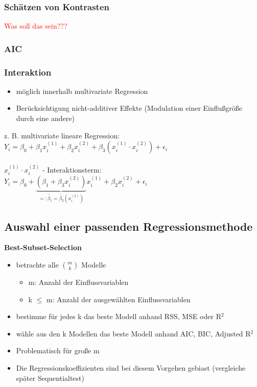 \subsubsection{Schätzen von Kontrasten}
\textcolor{red}{Was soll das sein???}
\subsubsection{AIC}

\subsubsection{Interaktion}
\begin{itemize}
	\item möglich innerhalb multivariate Regression
	\item Berücksichtigung nicht-additiver Effekte (Modulation einer Einflußgröße durch eine andere)
\end{itemize}

z. B. multivariate lineare Regression:\\
$Y_i=\beta_0 + \beta_1 x_i^{(1)} + \beta_2 x_i^{(2)} + \beta_3 (x_i^{(1)} \cdot x_i^{(2)}) + \epsilon_i$
\\\\
$x_i^{(1)} \cdot x_i^{(2)}$ - Interaktionsterm:\\
$Y_i=\beta_0 + \underbrace{(\beta_1 + \beta_3 x_i^{(2)})}_{=: \tilde{\beta_1}=\tilde{\beta_2}(x_i^{(2)})}x_i^{(1)} + \beta_2 x_i^{(2)} + \epsilon_i$

\subsection{Auswahl einer passenden Regressionsmethode}
\textbf{Best-Subset-Selection}
\begin{itemize}
	\item betrachte alle $\binom{m}{k}$ Modelle
	\begin{itemize}
		\item m: Anzahl der Einflussvariablen
		\item k $\leq$ m: Anzahl der ausgewählten Einflussvariablen
	\end{itemize}
	\item bestimme für jedes k das beste Modell anhand RSS, MSE oder R$^2$
	\item wähle aus den k Modellen das beste Modell anhand AIC,
BIC, Adjusted R$^2$
	\item Problematisch für große m
	\item Die Regressionskoeffizienten sind bei diesem Vorgehen gebiast (vergleiche später Sequentialtest)
\end{itemize}

